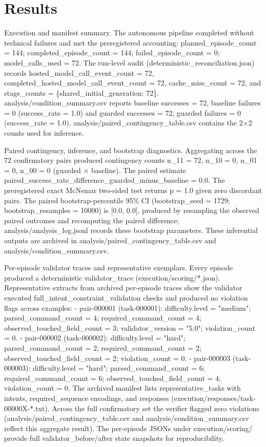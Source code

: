 \documentclass[conference]{IEEEtran}
\begin{document}
\section{Results}
Execution and manifest summary. The autonomous pipeline completed without technical failures and met the preregistered accounting: planned\_episode\_count = 144; completed\_episode\_count = 144; failed\_episode\_count = 0; model\_calls\_used = 72. The run-level audit (deterministic\_reconciliation.json) records hosted\_model\_call\_event\_count = 72, completed\_hosted\_model\_call\_event\_count = 72, cache\_miss\_count = 72, and stage\_counts = \{shared\_initial\_generation: 72\}. analysis/condition\_summary.csv reports baseline successes = 72, baseline failures = 0 (success\_rate = 1.0) and guarded successes = 72, guarded failures = 0 (success\_rate = 1.0). analysis/paired\_contingency\_table.csv contains the 2\ensuremath{\times}2 counts used for inference.

Paired contingency, inference, and bootstrap diagnostics. Aggregating across the 72 confirmatory pairs produced contingency counts n\_11 = 72, n\_10 = 0, n\_01 = 0, n\_00 = 0 (guarded \ensuremath{\times} baseline). The paired estimate paired\_success\_rate\_difference\_guarded\_minus\_baseline = 0.0. The preregistered exact McNemar two-sided test returns p = 1.0 given zero discordant pairs. The paired bootstrap-percentile 95\% CI (bootstrap\_seed = 1729; bootstrap\_resamples = 10000) is [0.0, 0.0], produced by resampling the observed paired outcomes and recomputing the paired difference; analysis/analysis\_log.jsonl records these bootstrap parameters. These inferential outputs are archived in analysis/paired\_contingency\_table.csv and analysis/condition\_summary.csv.

Per-episode validator traces and representative exemplars. Every episode produced a deterministic validator\_trace (execution/scoring/*.json). Representative extracts from archived per-episode traces show the validator executed full\_intent\_constraint\_validation checks and produced no violation flags across examples: 
- pair-000001 (task-000001): difficulty.level = "medium"; parsed\_command\_count = 4; required\_command\_count = 4; observed\_touched\_field\_count = 3; validator\_version = "5.0"; violation\_count = 0.
- pair-000002 (task-000002): difficulty.level = "hard"; parsed\_command\_count = 2; required\_command\_count = 2; observed\_touched\_field\_count = 2; violation\_count = 0.
- pair-000003 (task-000003): difficulty.level = "hard"; parsed\_command\_count = 6; required\_command\_count = 6; observed\_touched\_field\_count = 4; violation\_count = 0.
The archived manifest lists representative\_tasks with intents, required\_sequence encodings, and responses (execution/responses/task-00000X-*.txt). Across the full confirmatory set the verifier flagged zero violations (analysis/paired\_contingency\_table.csv and analysis/condition\_summary.csv reflect this aggregate result). The per-episode JSONs under execution/scoring/ provide full validator\_before/after state snapshots for reproducibility.
\end{document}
